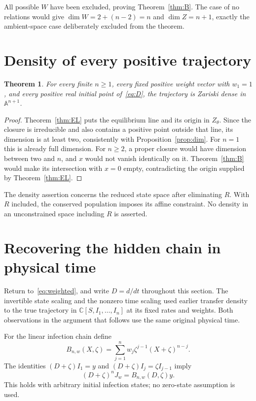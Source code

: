 \documentclass[11pt]{article}
\newtheorem{theorem}{Theorem}[section]
\theoremstyle{remark}\newtheorem{remark}[theorem]{Remark}
\newcommand{\C}{\mathbb C}
\newcommand{\A}{\mathbb A}
\begin{document}
All possible $W$ have been excluded, proving Theorem~\ref{thm:B}. The case of no relations would give $\dim W=2+(n-2)=n$ and $\dim Z=n+1$, exactly the ambient-space case deliberately excluded from the theorem.

\section{Density of every positive trajectory}
\begin{theorem}\label{thm:density}
For every finite $n\geq1$, every fixed positive weight vector with $w_1=1$, and every positive real initial point of~\eqref{eq:D}, the trajectory is Zariski dense in $\A^{n+1}$.
\end{theorem}
\begin{proof}
Theorem~\ref{thm:EL} puts the equilibrium line and its origin in $Z_\theta$. Since the closure is irreducible and also contains a positive point outside that line, its dimension is at least two, consistently with Proposition~\ref{prop:dim}. For $n=1$ this is already full dimension. For $n\geq2$, a proper closure would have dimension between two and $n$, and $x$ would not vanish identically on it. Theorem~\ref{thm:B} would make its intersection with $x=0$ empty, contradicting the origin supplied by Theorem~\ref{thm:EL}.
\end{proof}
The density assertion concerns the reduced state space after eliminating $R$. With $R$ included, the conserved population imposes its affine constraint. No density in an unconstrained space including $R$ is asserted.

\section{Recovering the hidden chain in physical time}\label{sec:recovery}
Return to~\eqref{eq:weighted}, and write $D=d/dt$ throughout this section. The invertible state scaling and the nonzero time scaling used earlier transfer density to the true trajectory in $\C[S,I_1,\ldots,I_n]$ at its fixed rates and weights. Both observations in the argument that follows use the same original physical time.

For the linear infection chain define
\begin{equation}\label{eq:Bn}
 B_{n,w}(X,\zeta)=\sum_{j=1}^n w_j\zeta^{j-1}(X+\zeta)^{n-j}.
\end{equation}
The identities $(D+\zeta)I_1=y$ and $(D+\zeta)I_j=\zeta I_{j-1}$ imply
\begin{equation}\label{eq:chain}
 (D+\zeta)^nJ_w=B_{n,w}(D,\zeta)y.
\end{equation}
This holds with arbitrary initial infection states; no zero-state assumption is used.
\end{document}
